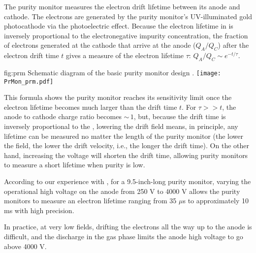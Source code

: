 The purity monitor measures the electron drift lifetime between its anode and cathode. The electrons are generated by the purity monitor's UV-illuminated gold photocathode via the photoelectric effect. Because the electron lifetime in \lar is inversely proportional to the electronegative impurity concentration, the fraction of electrons generated at the cathode that arrive at the anode ($Q_A/Q_C$) after the electron drift time $t$ gives a measure of the electron lifetime $\tau$:
%
\( Q_A/Q_C \sim e^{-t/\tau}.\)



\begin{dunefigure}{fig:prm}
  {Schematic diagram of the basic purity monitor design \cite{Adamowski:2014daa}.}
  \texttt{[image: PrMon\_prm.pdf]}
\end{dunefigure}


%

This formula shows the purity monitor reaches its sensitivity limit once the electron lifetime becomes much larger than the drift time $t$. For $\tau >> t$, the anode to cathode charge ratio becomes $\sim\,1$, but, because the drift time is inversely proportional to the \efield, lowering the drift field means, in principle, any lifetime can be measured no matter the length of the purity monitor (the lower the field, the lower the drift velocity, i.e., the longer the drift time). On the other hand, increasing the voltage will shorten the drift time, allowing purity monitors to measure a short lifetime when purity is low. 

According to our experience with , for a 9.5-inch-long purity monitor, varying the operational high voltage on the anode from 250 V to 4000 V allows the purity monitors to measure an electron lifetime ranging from 35 $\mu$s to approximately 10 ms with high precision. 

In practice, at very low fields, drifting the electrons all the way up to the anode is difficult, and the discharge in the gas phase limits the anode high voltage to go above 4000 V. 

